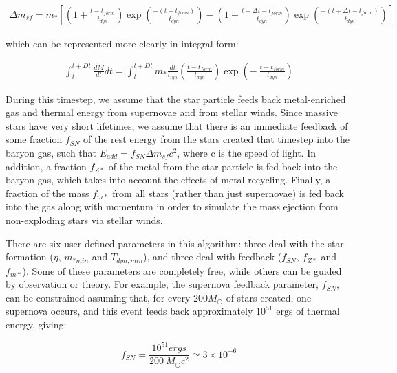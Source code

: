 \begin{eqnarray}  
\Delta m_{sf} =  m_{*} \left[ \left(1 + \frac{t-t_{form}}{t_{dyn}}  \right)
		   \exp{\left( \frac{-(t-t_{form})}{t_{dyn}} \right) }
	       - \left( 1 + \frac{t+ \Delta t-t_{form}}{t_{dyn}} \right) 
                    \exp{ \left( \frac{-(t+\Delta t-t_{form})}{t_{dyn}} \right)  }
                   \right]
\end{eqnarray}

which can be represented more clearly in integral form:

\begin{eqnarray}
\int_{t}^{t+Dt} \frac{dM}{dt} dt = \int_{t}^{t+Dt} m_{*} 
\frac{dt}{t_{tyn}} \left( \frac{t-t_{form}}{t_{dyn}} \right) 
\exp{ \left( - ~ \frac{t-t_{form}}{t_{dyn}} \right) }
\end{eqnarray}

During this timestep, we assume that the star particle feeds back
metal-enriched gas and thermal energy from supernovae and from stellar
winds.  Since massive stars have very short lifetimes, we assume that
there is an immediate feedback of some fraction $f_{SN}$ of the rest
energy from the stars created that timestep into the baryon gas, such
that $E_{add} = f_{SN} \Delta m_{sf} c^2$, where c is the speed of
light.  In addition, a fraction $f_{Z*}$ of the metal from the star
particle is fed back into the baryon gas, which takes into account the
effects of metal recycling.  Finally, a fraction of the mass $f_{m*}$
from all stars (rather than just supernovae) is fed back into the gas
along with momentum in order to simulate the mass ejection from
non-exploding stars via stellar winds.

There are six user-defined parameters in this algorithm: three deal
with the star formation ($\eta$, $m_{*min}$ and $T_{dyn,min}$), and
three deal with feedback ($f_{SN}$, $f_{Z*}$ and $f_{m*}$).  Some of
these parameters are completely free, while others can be guided by
observation or theory.  For example, the supernova feedback parameter,
$f_{SN}$, can be constrained assuming that, for every $200 M_\odot$ of
stars created, one supernova occurs, and this event feeds back
approximately $10^{51}$ ergs of thermal energy, giving:

\begin{equation}
f_{SN} = \frac{10^{51} ergs}{200~M_\odot c^2} \simeq 3 \times 10^{-6}
\end{equation}

